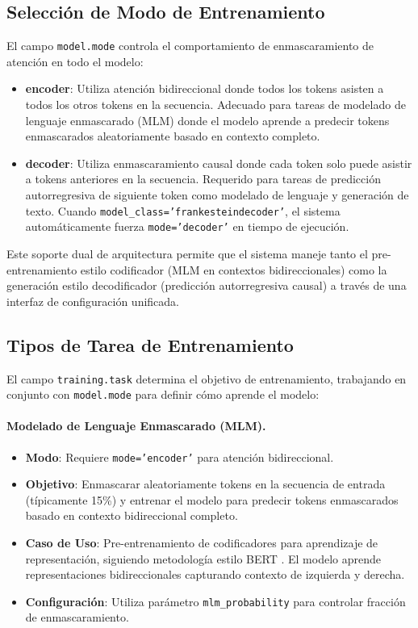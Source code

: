 \documentclass[11pt,a4paper]{article}
\begin{document}
\subsection{Selección de Modo de Entrenamiento}

El campo \texttt{model.mode} controla el comportamiento de enmascaramiento de atención en todo el modelo:

\begin{itemize}[leftmargin=*]
    \item \textbf{encoder}: Utiliza atención bidireccional donde todos los tokens asisten a todos los otros tokens en la secuencia. Adecuado para tareas de modelado de lenguaje enmascarado (MLM) donde el modelo aprende a predecir tokens enmascarados aleatoriamente basado en contexto completo.
    \item \textbf{decoder}: Utiliza enmascaramiento causal donde cada token solo puede asistir a tokens anteriores en la secuencia. Requerido para tareas de predicción autorregresiva de siguiente token como modelado de lenguaje y generación de texto. Cuando \texttt{model\_class='frankesteindecoder'}, el sistema automáticamente fuerza \texttt{mode='decoder'} en tiempo de ejecución.
\end{itemize}

Este soporte dual de arquitectura permite que el sistema maneje tanto el pre-entrenamiento estilo codificador (MLM en contextos bidireccionales) como la generación estilo decodificador (predicción autorregresiva causal) a través de una interfaz de configuración unificada.

\subsection{Tipos de Tarea de Entrenamiento}

El campo \texttt{training.task} determina el objetivo de entrenamiento, trabajando en conjunto con \texttt{model.mode} para definir cómo aprende el modelo:

\paragraph{Modelado de Lenguaje Enmascarado (MLM).}
\begin{itemize}[leftmargin=*]
    \item \textbf{Modo}: Requiere \texttt{mode='encoder'} para atención bidireccional.
    \item \textbf{Objetivo}: Enmascarar aleatoriamente tokens en la secuencia de entrada (típicamente 15\%) y entrenar el modelo para predecir tokens enmascarados basado en contexto bidireccional completo.
    \item \textbf{Caso de Uso}: Pre-entrenamiento de codificadores para aprendizaje de representación, siguiendo metodología estilo BERT \citep{devlin_bert_2019}. El modelo aprende representaciones bidireccionales capturando contexto de izquierda y derecha.
    \item \textbf{Configuración}: Utiliza parámetro \texttt{mlm\_probability} para controlar fracción de enmascaramiento.
\end{itemize}
\end{document}
